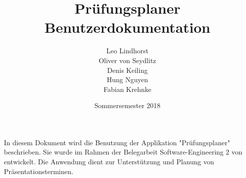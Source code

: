 \documentclass{scrartcl}
\begin{document}
	\title{Prüfungsplaner \\ Benutzerdokumentation}
	\author{Leo Lindhorst\\
		Oliver von Seydlitz\\
		Denis Keiling\\
		Hung Nguyen\\
		Fabian Krehnke}
	\date{Sommersemester 2018}
	\maketitle
	
	 In diesem Dokument wird die Benutzung der Applikation "Prüfungsplaner" beschrieben. Sie wurde im Rahmen der Belegarbeit Software-Engineering 2 von entwickelt. Die Anwendung dient zur Unterstützung und Planung von Präsentationsterminen.
	
	\tableofcontents
	
	
	
\end{document}
